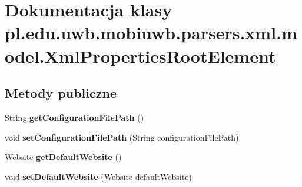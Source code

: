 \hypertarget{classpl_1_1edu_1_1uwb_1_1mobiuwb_1_1parsers_1_1xml_1_1model_1_1_xml_properties_root_element}{}\section{Dokumentacja klasy pl.\+edu.\+uwb.\+mobiuwb.\+parsers.\+xml.\+model.\+Xml\+Properties\+Root\+Element}
\label{classpl_1_1edu_1_1uwb_1_1mobiuwb_1_1parsers_1_1xml_1_1model_1_1_xml_properties_root_element}
\subsection*{Metody publiczne}
\begin{DoxyCompactItemize}
\item 
\hypertarget{classpl_1_1edu_1_1uwb_1_1mobiuwb_1_1parsers_1_1xml_1_1model_1_1_xml_properties_root_element_ac481ca464cccb7e402093341506e192d}{}String {\bfseries get\+Configuration\+File\+Path} ()\label{classpl_1_1edu_1_1uwb_1_1mobiuwb_1_1parsers_1_1xml_1_1model_1_1_xml_properties_root_element_ac481ca464cccb7e402093341506e192d}

\item 
\hypertarget{classpl_1_1edu_1_1uwb_1_1mobiuwb_1_1parsers_1_1xml_1_1model_1_1_xml_properties_root_element_a61a14852b368f9a77f350794d1521954}{}void {\bfseries set\+Configuration\+File\+Path} (String configuration\+File\+Path)\label{classpl_1_1edu_1_1uwb_1_1mobiuwb_1_1parsers_1_1xml_1_1model_1_1_xml_properties_root_element_a61a14852b368f9a77f350794d1521954}

\item 
\hypertarget{classpl_1_1edu_1_1uwb_1_1mobiuwb_1_1parsers_1_1xml_1_1model_1_1_xml_properties_root_element_a98c074fa63bf5fdd61b1cc17270388f7}{}\hyperlink{classpl_1_1edu_1_1uwb_1_1mobiuwb_1_1parsers_1_1xml_1_1model_1_1_website}{Website} {\bfseries get\+Default\+Website} ()\label{classpl_1_1edu_1_1uwb_1_1mobiuwb_1_1parsers_1_1xml_1_1model_1_1_xml_properties_root_element_a98c074fa63bf5fdd61b1cc17270388f7}

\item 
\hypertarget{classpl_1_1edu_1_1uwb_1_1mobiuwb_1_1parsers_1_1xml_1_1model_1_1_xml_properties_root_element_a3ccb38068728d5edf0b3d5780e94b6d1}{}void {\bfseries set\+Default\+Website} (\hyperlink{classpl_1_1edu_1_1uwb_1_1mobiuwb_1_1parsers_1_1xml_1_1model_1_1_website}{Website} default\+Website)\label{classpl_1_1edu_1_1uwb_1_1mobiuwb_1_1parsers_1_1xml_1_1model_1_1_xml_properties_root_element_a3ccb38068728d5edf0b3d5780e94b6d1}


\end{DoxyCompactItemize}
